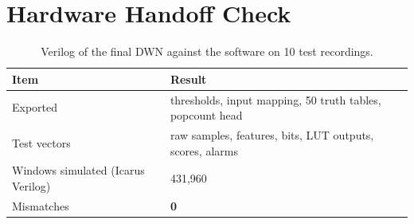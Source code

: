 \section{Hardware Handoff Check}\label{sec:res-hw}

\begin{table}[H]
\centering\small
\caption{Verilog of the final DWN against the software on 10 test recordings.}\label{tab:verilog}
\begin{tabular}{@{}ll@{}}
\toprule
\textbf{Item} & \textbf{Result}\\
\midrule
Exported & thresholds, input mapping, 50 truth tables, popcount head\\
Test vectors & raw samples, features, bits, LUT outputs, scores, alarms\\
Windows simulated (Icarus Verilog) & 431,960\\
Mismatches & \textbf{0}\\
\bottomrule
\end{tabular}
\end{table}
